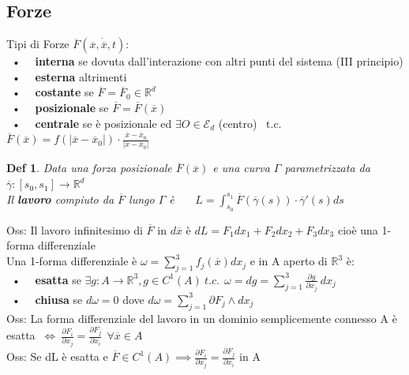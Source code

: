 \documentclass{article}
\theoremstyle{unnumbered}
\newtheorem* {theoremT}{Def}
\theoremstyle{unnumbered1}
\newenvironment{defi}{\begin{gBox}\begin{theoremT}}{\end{theoremT}\end{gBox}}
\begin{document}

\subsection{Forze}
%
Tipi di Forze $\overline{F}(\overline{x}, \dot{\overline{x}},t)$:\\
\ • \ \ \textbf{interna} se dovuta dall'interazione con altri punti del sistema (III principio)\\
\ • \ \ \textbf{esterna} altrimenti \\
\ • \ \ \textbf{costante} se $\overline{F} = \overline{F}_0 \in \mathbb{R}^d$\\
\ • \ \ \textbf{posizionale} se $\overline{F} = \overline{F}(\overline{x})$\\
\ • \ \ \textbf{centrale} se è posizionale ed $\exists O \in \mathcal{E}_d$ (centro) \ t.c. $\overline{F}(\overline{x})=f(|\overline{x}-\overline{x}_0|)\cdot \frac{\overline{x}-\overline{x}_0}{|\overline{x}-\overline{x}_0|}$\\
%
%
%
\begin{defi}
Data una forza posizionale $\overline{F}(\overline{x})$ e una curva $\Gamma$ parametrizzata da $\overline{\gamma}:[s_0,s_1]\rightarrow\mathbb{R}^d$\\
Il \textbf{lavoro} compiuto da $\overline{F}$ lungo $\Gamma$ è \ \ \ $L=\int^{s_1}_{s_0} \overline{F}(\overline{\gamma}(s))\cdot\overline{\gamma}'(s)ds$
\end{defi}
%
%
%
Oss: Il lavoro infinitesimo di $\overline{F}$ in $d\overline{x}$ è $dL = F_1dx_1 + F_2dx_2+ F_3dx_3$ cioè una 1-forma differenziale\\
%
Una 1-forma differenziale è $\omega=\sum_{j=1}^3 f_j(\overline{x})dx_j$ e in A aperto di $\mathbb{R}^3$ è:\\
\ • \ \ \textbf{esatta}  se $\exists g:A\rightarrow\mathbb{R}^3, g\in C^1(A) \ t.c. \ \ \omega = dg = \sum_{j=1}^3 \frac{\partial g}{\partial x_j} \ dx_j$ \\
\ • \ \ \textbf{chiusa} se $d\omega=0$ dove $d\omega= \sum_{j=1}^3 \partial F_j \wedge dx_j$ \\
%
Oss: La forma differenziale del lavoro in un dominio semplicemente connesso A è esatta  $\ \Leftrightarrow \ \frac{\partial F_i}{\partial x_j}=\frac{\partial F_j}{\partial x_i} \ \ \forall \overline{x}\in A$\\
%
Oss: Se dL è esatta e $\overline{F}\in C^1(A) \implies \frac{\partial F_i}{\partial x_j}=\frac{\partial F_j}{\partial x_i}$ in A \\ \\
\end{document}
